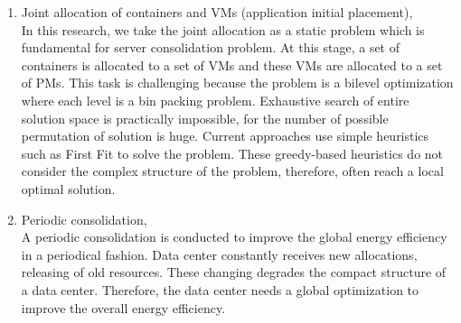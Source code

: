 \begin{enumerate}
\item Joint allocation of containers and VMs (application initial placement), \\
In this research, we take the joint allocation as a static problem which is fundamental for server consolidation problem. At this stage, a set of containers is allocated to a set of VMs and these VMs are allocated to a set of PMs. This task is challenging because the problem is a bilevel optimization where each level is a bin packing problem. Exhaustive search of entire solution space is practically impossible, for the number of possible permutation of solution is huge. Current approaches \cite{Piraghaj:2016bw,Hindman:2011ux} use simple heuristics such as First Fit to solve the problem. These greedy-based heuristics do not consider the complex structure of the problem, therefore, often reach a local optimal solution.




\item Periodic consolidation, \\
A periodic consolidation is conducted to improve the global energy efficiency in a periodical fashion. Data center constantly receives new allocations, releasing of old resources. These changing degrades the compact structure of a data center. Therefore, the data center needs a global optimization to improve the overall energy efficiency.


\end{enumerate}
